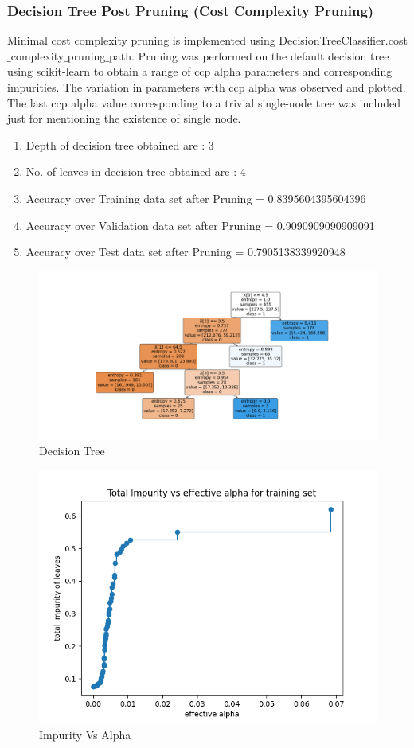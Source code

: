 \documentclass[11pt]{article}
\begin{document}
\subsubsection{Decision Tree Post Pruning (Cost Complexity Pruning)}
Minimal cost complexity pruning is implemented using DecisionTreeClassifier.cost$\_$complexity$\_$pruning$\_$path. Pruning was performed on the default decision tree using scikit-learn to obtain a range of ccp alpha parameters and corresponding impurities. The variation in parameters with ccp alpha was observed and plotted. The last ccp alpha value corresponding to a trivial single-node tree was included just for mentioning the existence of single node.
\begin{enumerate}
\item Depth of decision tree obtained are : 3
\item No. of leaves in decision tree obtained are : 4
\item Accuracy over Training data set after Pruning = 0.8395604395604396
\item Accuracy over Validation data set after Pruning = 0.9090909090909091
\item Accuracy over Test data set after Pruning = 0.7905138339920948
\end{enumerate}
\begin{figure}[H]
  \includegraphics[width=\linewidth]{1_c_Best_pruned_tree.png}
  \caption{Decision Tree}
  \label{fig1B}
\end{figure}
\begin{figure}[H]
  \includegraphics[width=\linewidth]{1_c_impurity_vs_alpha.png}
  \caption{Impurity Vs Alpha}
  \label{fig1B}
\end{figure}
\end{document}
